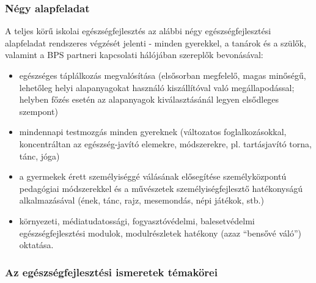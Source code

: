 \subsubsection{Négy alapfeladat}\label{nuxe9gy-alapfeladat}

A teljes körű iskolai egészségfejlesztés az alábbi négy
egészségfejlesztési alapfeladat rendszeres végzését jelenti - minden
gyerekkel, a tanárok és a szülők, valamint a BPS partneri kapcsolati
hálójában szereplők bevonásával:

\begin{itemize}

      \item
            egészséges táplálkozás megvalósítása (elsősorban megfelelő, magas
            minőségű, lehetőleg helyi alapanyagokat használó kiszállítóval való
            megállapodással; helyben főzés esetén az alapanyagok
            kiválasztásánál
            legyen elsődleges szempont)
      \item
            mindennapi testmozgás minden gyereknek (változatos
            foglalkozásokkal,
            koncentráltan az egészség-javító elemekre, módszerekre, pl.
            tartásjavító torna, tánc, jóga)
      \item
            a gyermekek érett személyiséggé válásának elősegítése
            személyközpontú
            pedagógiai módszerekkel és a művészetek személyiségfejlesztő
            hatékonyságú alkalmazásával (ének, tánc, rajz, mesemondás, népi
            játékok, stb.)
      \item
            környezeti, médiatudatossági, fogyasztóvédelmi, balesetvédelmi
            egészségfejlesztési modulok, modulrészletek hatékony (azaz
            ``bensővé
            váló'') oktatása.
\end{itemize}

\subsubsection{Az egészségfejlesztési ismeretek
      témakörei}

